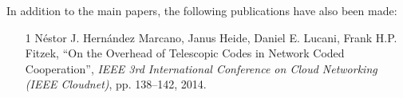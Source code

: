 \noindent In addition to the main papers, the following publications have also been made:
\begin{itemize}

  \item[{1}] N\'estor J. Hern\'andez Marcano, Janus Heide, Daniel E. Lucani, Frank H.P. Fitzek, ``On the Overhead of Telescopic Codes in Network Coded Cooperation'', \emph{IEEE 3rd International Conference on Cloud Networking (IEEE Cloudnet)}, pp. 138--142, 2014.











\end{itemize}

